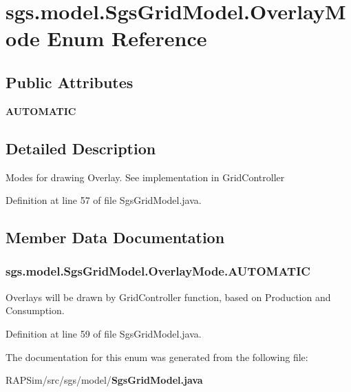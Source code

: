 \section{sgs.\-model.\-Sgs\-Grid\-Model.\-Overlay\-Mode Enum Reference}
\label{enumsgs_1_1model_1_1_sgs_grid_model_1_1_overlay_mode}
\subsection*{Public Attributes}
\begin{DoxyCompactItemize}
\item 
{\bf A\-U\-T\-O\-M\-A\-T\-I\-C}
\end{DoxyCompactItemize}


\subsection{Detailed Description}
Modes for drawing Overlay. See implementation in Grid\-Controller 

Definition at line 57 of file Sgs\-Grid\-Model.\-java.



\subsection{Member Data Documentation}
\subsubsection[{A\-U\-T\-O\-M\-A\-T\-I\-C}]{\setlength{\rightskip}{0pt plus 5cm}sgs.\-model.\-Sgs\-Grid\-Model.\-Overlay\-Mode.\-A\-U\-T\-O\-M\-A\-T\-I\-C}\label{enumsgs_1_1model_1_1_sgs_grid_model_1_1_overlay_mode_a07138582f1081e6f1b42d1bc68c45cc4}
Overlays will be drawn by Grid\-Controller function, based on Production and Consumption. 

Definition at line 59 of file Sgs\-Grid\-Model.\-java.



The documentation for this enum was generated from the following file\-:\begin{DoxyCompactItemize}
\item 
R\-A\-P\-Sim/src/sgs/model/{\bf Sgs\-Grid\-Model.\-java}\end{DoxyCompactItemize}
